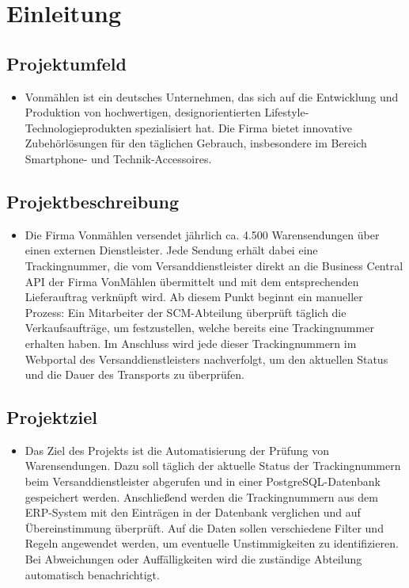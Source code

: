 \section{Einleitung}
\label{sec:Einleitung}


\subsection{Projektumfeld} 
\label{sec:Projektumfeld}
\begin{itemize}
	\item Vonmählen ist ein deutsches Unternehmen, das sich auf die Entwicklung und Produktion von hochwertigen, 
	designorientierten Lifestyle-Technologieprodukten spezialisiert hat. Die Firma bietet innovative Zubehörlösungen 
	für den täglichen Gebrauch, insbesondere im Bereich Smartphone- und Technik-Accessoires.
\end{itemize}
\subsection{Projektbeschreibung}
\label{sec:Projektbeschreibung}
\begin{itemize}
	\item Die Firma Vonmählen versendet jährlich ca. 4.500 Warensendungen über einen externen Dienstleister. Jede Sendung erhält dabei eine Trackingnummer, die vom Versanddienstleister direkt an die Business Central API der Firma VonMählen übermittelt und mit dem entsprechenden Lieferauftrag verknüpft wird.
	Ab diesem Punkt beginnt ein manueller Prozess: Ein Mitarbeiter der SCM-Abteilung überprüft täglich die Verkaufsaufträge, um festzustellen, welche bereits eine Trackingnummer erhalten haben. Im Anschluss wird jede dieser Trackingnummern im Webportal des Versanddienstleisters nachverfolgt, um den aktuellen Status und die Dauer des Transports zu überprüfen.
	
\end{itemize}			

\subsection{Projektziel} 
\label{sec:Projektziel}

\begin{itemize}
	\item Das Ziel des Projekts ist die Automatisierung der Prüfung von Warensendungen. Dazu soll täglich der aktuelle Status der Trackingnummern beim Versanddienstleister abgerufen und in einer PostgreSQL-Datenbank gespeichert werden. Anschließend werden die Trackingnummern aus dem ERP-System mit den Einträgen in der Datenbank verglichen und auf Übereinstimmung überprüft.
	Auf die Daten sollen verschiedene Filter und Regeln angewendet werden, um eventuelle Unstimmigkeiten zu identifizieren. Bei Abweichungen oder Auffälligkeiten wird die zuständige Abteilung automatisch benachrichtigt.
	
\end{itemize}	


